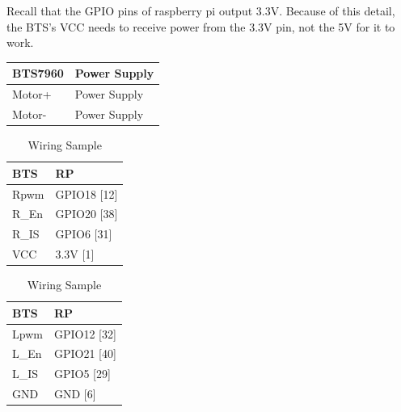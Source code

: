 \documentclass[a4paper, 10pt]{article}
\begin{document}
    Recall that the GPIO pins of raspberry pi output 3.3V. Because of this detail, the BTS's VCC needs to receive power from the 3.3V pin, not the 5V for it to work.

        \begin{table}[h]
        \centering
        \begin{tabular}{|l|l|}
        \hline
        \textbf{BTS7960} & \textbf{Power Supply} \\
        \hline
        Motor+ & Power Supply \\
        \hline
        Motor- & Power Supply \\
        \hline
        \end{tabular}
        \label{tab:motor}
        \end{table}
        
        \begin{table}[h]
        \centering
        \begin{minipage}{.35\linewidth}
        \centering
        \begin{tabular}{|l|l|}
        \hline
        \textbf{BTS} & \textbf{RP} \\
        \hline
        Rpwm & GPIO18 [12] \\
        \hline
        R\_En & GPIO20 [38] \\
        \hline
        R\_IS & GPIO6 [31] \\
        \hline
        VCC & 3.3V [1] \\
        \hline
        \end{tabular}
        \label{tab:right}
        \end{minipage}
        \begin{minipage}{.3\linewidth}
        \centering
        \begin{tabular}{|l|l|}
        \hline
        \textbf{BTS} & \textbf{RP} \\
        \hline
        Lpwm & GPIO12 [32] \\
        \hline
        L\_En & GPIO21 [40] \\
        \hline
        L\_IS & GPIO5 [29] \\
        \hline
        GND & GND [6] \\
        \hline
        \end{tabular}
        \label{tab:left}
        \end{minipage}
        \caption{Wiring Sample}
        \label{tab:pwm}
        \end{table}
\end{document}
